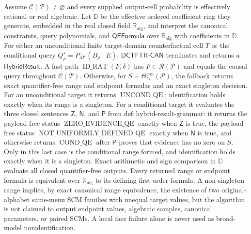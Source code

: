 Assume \(\mathcal C(\mathcal P)\ne\varnothing\) and every supplied output-cell probability is effectively rational or real algebraic.  Let \(\mathbb D\) be the effective ordered coefficient ring they generate, embedded in the real closed field \(\mathbb R_{\mathrm{alg}}\), and interpret the canonical constraints, query polynomials, and \(\mathsf{QEFormula}\) over \(\mathbb R_{\mathrm{alg}}\) with coefficients in \(\mathbb D\).  For either an unconditional finite target-domain counterfactual cell \(T\) or the conditional query \(Q_\rho^\star=P_{M^\star}(B_\rho\mid E)\), \(\mathsf{DCTFTR\text{-}CAN}\) terminates and returns a \(\mathsf{HybridResult}\).  A fast-path \(\operatorname{ID\_RAT}(F,\delta)\) has \(F\in\mathscr R(\mathcal P)\) and equals the causal query throughout \(\mathcal C(\mathcal P)\).  Otherwise, for \(S=\Theta_G^{\mathrm{can}}(\mathcal P)\), the fallback returns exact quantifier-free range and endpoint formulas and an exact singleton decision.  For an unconditional target it returns \(\operatorname{UNCOND\_QE}\); identification holds exactly when its range is a singleton.  For a conditional target it evaluates the three closed sentences \(\mathsf Z\), \(\mathsf N\), and \(\mathsf P\) from \(\mathrm{def:hybrid\text{-}result\text{-}grammar}\): it returns the payload-free status \(\operatorname{ZERO\_EVIDENCE\_QE}\) exactly when \(\mathsf Z\) is true, the payload-free status \(\operatorname{NOT\_UNIFORMLY\_DEFINED\_QE}\) exactly when \(\mathsf N\) is true, and otherwise returns \(\operatorname{COND\_QE}\) after \(\mathsf P\) proves that evidence has no zero on \(S\).  Only in this last case is the conditional range formed, and identification holds exactly when it is a singleton.  Exact arithmetic and sign comparison in \(\mathbb D\) evaluate all closed quantifier-free outputs.  Every returned range or endpoint formula is equivalent over \(\mathbb R_{\mathrm{alg}}\) to its defining first-order formula.  A non-singleton range implies, by exact canonical range equivalence, the existence of two original-alphabet same-menu SCM families with unequal target values, but the algorithm is not claimed to output endpoint values, algebraic samples, canonical parameters, or paired SCMs.  A local face failure alone is never used as broad-model nonidentification.